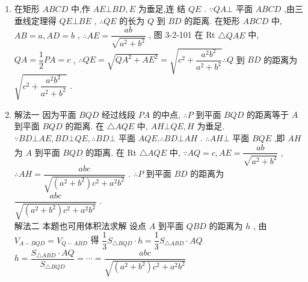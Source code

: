 \begin{enumerate}
\begin{jieda}
    \begin{enumerate}
        \item 在矩形 \( {ABCD} \) 中,作 \( {AE}\bot {BD},E \) 为垂足,连
结 \( {QE} \) .
\( \because {QA} \bot \) 平面 \( {ABCD} \) ,由三垂线定理得 \( {QE} \bot  {BE} \) ,
\( \therefore {QE} \) 的长为 \( Q \) 到 \( {BD} \) 的距离.
在矩形 \( {ABCD} \) 中, \( {AB} = a,{AD} = b \) ,
\( \therefore {AE} = \dfrac{ab}{\sqrt{{a}^{2} + {b}^{2}}} \) , 图 3-2-101
在 Rt \( \bigtriangleup {QAE} \) 中, \( {QA} = \dfrac{1}{2}{PA} = c \) ,
\( \therefore {QE} = \sqrt{Q{A}^{2} + A{E}^{2}} = \sqrt{{c}^{2} + \dfrac{{a}^{2}{b}^{2}}{{a}^{2} + {b}^{2}}}\therefore Q \) 到 \( {BD} \) 的距离为 \( \sqrt{{c}^{2} + \dfrac{{a}^{2}{b}^{2}}{{a}^{2} + {b}^{2}}} \) .
    \item 解法一 因为平面 \( {BQD} \) 经过线段 \( {PA} \) 的中点,
\( \therefore P \) 到平面 \( {BQD} \) 的距离等于 \( A \) 到平面 \( {BQD} \) 的距离.
在 \( \bigtriangleup {AQE} \) 中, \( {AH}\bot {QE},H \) 为垂足.
\( \because {BD} \bot  {AE},{BD} \bot  {QE},\therefore {BD} \bot \) 平面 \( {AQE}.\therefore {BD} \bot  {AH} \) .
\( \therefore {AH} \bot \) 平面 \( {BQE} \) ,即 \( {AH} \) 为 \( A \) 到平面 \( {BQD} \) 的距离.
在 Rt \( \bigtriangleup {AQE} \) 中, \( \because {AQ} = c,{AE} = \dfrac{ab}{\sqrt{{a}^{2} + {b}^{2}}} \) ,
\( \therefore {AH} = \dfrac{abc}{\sqrt{\left( {{a}^{2} + {b}^{2}}\right) {c}^{2} + {a}^{2}{b}^{2}}} \) .
\( \therefore P \) 到平面 \( {BD} \) 的距离为 \( \dfrac{abc}{\sqrt{\left( {{a}^{2} + {b}^{2}}\right) {c}^{2} + {a}^{2}{b}^{2}}} \) .\\
解法二 本题也可用体积法求解
设点 \( A \) 到平面 \( {QBD} \) 的距离为 \( h \) ,
由 \( {V}_{A - {BQD}} = {V}_{Q - {ABD}} \) 得
\( \dfrac{1}{3}{S}_{\bigtriangleup {BQD}} \cdot  h = \dfrac{1}{3}{S}_{\bigtriangleup {ABD}} \cdot  {AQ} \)
\( h = \dfrac{{S}_{\bigtriangleup {ABD}} \cdot  {AQ}}{{S}_{\bigtriangleup {BQD}}} = \cdots  = \dfrac{abc}{\sqrt{\left( {{a}^{2} + {b}^{2}}\right) {c}^{2} + {a}^{2}{b}^{2}}} \)
    \end{enumerate}
\end{jieda}



\end{enumerate}

